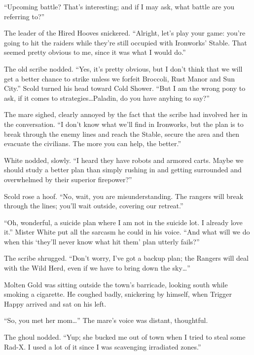 ``Upcoming battle? That's interesting; and if I may ask, what battle are you referring to?''

The leader of the Hired Hooves snickered. ``Alright, let's play your game: you're going to hit the raiders while they're still occupied with Ironworks' Stable. That seemed pretty obvious to me, since it was what I would do.''

The old scribe nodded. ``Yes, it's pretty obvious, but I don't think that we will get a better chance to strike unless we forfeit Broccoli, Rust Manor and Sun City.'' Scold turned his head toward Cold Shower. ``But I am the wrong pony to ask, if it comes to strategies\dots Paladin, do you have anyhing to say?''

The mare sighed, clearly annoyed by the fact that the scribe had involved her in the conversation. ``I don't know what we'll find in Ironworks, but the plan is to break through the enemy lines and reach the Stable, secure the area and then evacuate the civilians. The more you can help, the better.''

White nodded, slowly. ``I heard they have robots and armored carts. Maybe we should study a better plan than simply rushing in and getting surrounded and overwhelmed by their superior firepower?''

Scold rose a hoof. ``No, wait, you are misunderstanding. The rangers will break through the lines; you'll wait outside, covering our retreat.''

``Oh, wonderful, a suicide plan where I am not in the suicide lot. I already love it.'' Mister White put all the sarcasm he could in his voice. ``And what will we do when this `they'll never know what hit them' plan utterly fails?''

The scribe shrugged. ``Don't worry, I've got a backup plan; the Rangers will deal with the Wild Herd, even if we have to bring down the sky\dots''

\horizonline


Molten Gold was sitting outside the town's barricade, looking south while smoking a cigarette. He coughed badly, snickering by himself, when Trigger Happy arrived and sat on his left.

``So, you met her mom\dots'' The mare's voice was distant, thoughtful.

The ghoul nodded. ``Yup; she bucked me out of town when I tried to steal some Rad-X. I used a lot of it since I was scavenging irradiated zones.''

